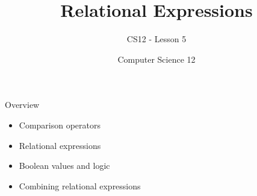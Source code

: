 \documentclass[10pt]{beamer}
\title{Relational Expressions}
\subtitle{CS12 - Lesson 5}
\author{Computer Science 12}
\date{}
\begin{document}
\begin{frame}
    \titlepage
\end{frame}

\begin{frame}{Overview}
    \begin{itemize}
        \item Comparison operators
        \item Relational expressions
        \item Boolean values and logic
        \item Combining relational expressions
    \end{itemize}
\end{frame}

\end{document}
